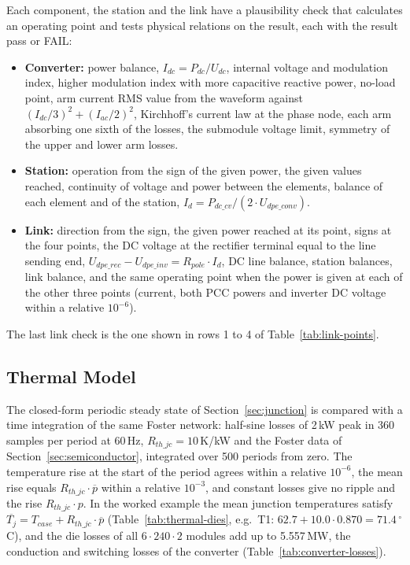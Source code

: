 Each component, the station and the link have a plausibility check that calculates an operating point and tests
physical relations on the result, each with the result pass or FAIL:
\begin{itemize}
  \item \textbf{Converter:} power balance, $I_{dc} = P_{dc}/U_{dc}$, internal voltage and modulation index, higher
        modulation index with more capacitive reactive power, no-load point, arm current RMS value from the waveform
        against $(I_{dc}/3)^2 + (I_{ac}/2)^2$, Kirchhoff's current law at the phase node, each arm absorbing one sixth
        of the losses, the submodule voltage limit, symmetry of the upper and lower arm losses.
  \item \textbf{Station:} operation from the sign of the given power, the given values reached, continuity of
        voltage and power between the elements, balance of each element and of the station,
        $I_d = P_{dc\_cv} / (2 \cdot U_{dpe\_conv})$.
  \item \textbf{Link:} direction from the sign, the given power reached at its point, signs at the four points,
        the DC voltage at the rectifier terminal equal to the line sending end, $U_{dpe\_rec} - U_{dpe\_inv} =
        R_{pole} \cdot I_d$, DC line balance, station balances, link balance, and the same operating point when the
        power is given at each of the other three points (current, both PCC powers and inverter DC voltage within a
        relative $10^{-6}$).
\end{itemize}
The last link check is the one shown in rows 1 to 4 of Table~\ref{tab:link-points}.

\subsection{Thermal Model}

The closed-form periodic steady state of Section~\ref{sec:junction} is compared with a time integration of the same
Foster network: half-sine losses of 2\,kW peak in 360 samples per period at 60\,Hz, $R_{th\_jc} = 10$\,K/kW and the
Foster data of Section~\ref{sec:semiconductor}, integrated over 500 periods from zero. The temperature rise at the
start of the period agrees within a relative $10^{-6}$, the mean rise equals $R_{th\_jc} \cdot \overline{p}$ within
a relative $10^{-3}$, and constant losses give no ripple and the rise $R_{th\_jc} \cdot p$. In the worked example the
mean junction temperatures satisfy $\overline{T_j} = T_{case} + R_{th\_jc} \cdot \overline{p}$
(Table~\ref{tab:thermal-dies}, e.g.\ T1: $62.7 + 10.0 \cdot 0.870 = 71.4\,^{\circ}$C), and the die losses of all
$6 \cdot 240 \cdot 2$ modules add up to 5.557\,MW, the conduction and switching losses of the converter
(Table~\ref{tab:converter-losses}).

